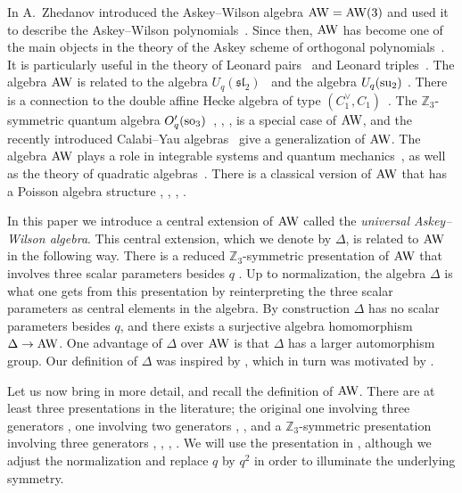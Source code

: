 \documentclass[pdftex]{sigma}
\numberwithin{equation}{section}
\begin{document}
In \cite{Zhidd}
A.~Zhedanov introduced the Askey--Wilson algebra
${\rm AW}=
{\rm AW}(3)$
and used it to
describe the Askey--Wilson polynomials~\cite{Askey}.
Since then, ${\rm AW}$ has become one of the main
objects in the theory
of the Askey scheme
of orthogonal polynomials~\cite{GYLZmut,
  GYZlinear,
  GH1,
KoeSwa, Koo1,Koo2, VZ2,VZ3}.
It is particularly useful
in the theory of
Leonard pairs~\cite{NT:span,
LS99,
madrid,
aw,
vidunas,
V2}
and Leonard triples~\cite{Curt2,Curt1,
koro}.
The algebra
${\rm AW}$
is related to
the algebra
$U_q(\mathfrak{sl}_2)$~\cite{GYZnature,
  GYZlinear,
Rosengren,
rosengren,
wieg}
and the algebra
{$U\sb q(\rm su\sb 2)$}
\cite{atak1, atak2,atak3}.
There is a connection to the
double af\/f\/ine Hecke algebra
of type $(C^\vee_1,C_1)$~\cite{dahater,
Koo1,Koo2}.
The $\mathbb Z_3$-symmetric quantum
algebra $O'_q({\rm so}_3)$~\cite[Remark~6.11]{ciccoli},
\cite{fairlie},
\cite[Section~3]{su2},
\cite{posta,
posta2,
jordan,
odesskii}
is a special case of
${\rm AW}$,  and
the recently introduced Calabi--Yau algebras~\cite{calabi} give a generalization
of
${\rm AW}$.
The algebra ${\rm AW}$
plays a role in
integrable systems
\cite{aneva,bas2,bas1,bas3,bas4,bas5,bas6,bas7,bas8,basnc,
lav1,lav2,lav3,VZ}
and quantum mechanics~\cite{odake2,
odake}, as well as
the theory of quadratic algebras~\cite{jordan,
kalnins,
ros}.
There is a classical version of
${\rm AW}$
that has
a Poisson algebra structure
\cite{GYLZmut}, \cite[equation~(2.9)]{koro}, \cite[equations (26)--(28)]{oblomkov}, \cite{LPcm}.

In this paper we introduce a
central extension of ${\rm AW}$
called the {\it universal Askey--Wilson algebra}.
This central extension, which we denote by
$\Delta$, is related to
${\rm AW}$ in the following way.
There is a
reduced $\mathbb Z_3$-symmetric presentation
of ${\rm AW}$ that involves three scalar
parameters besides $q$
\cite[equation~(6.1)]{koro}.
Up to normalization, the algebra
$\Delta $ is what one gets from
this presentation
by reinterpreting the three scalar parameters
as central elements in the algebra.
By construction
$\Delta$ has no scalar parameters besides $q$,
and there exists a surjective algebra homomorphism
$\Delta \to
{\rm AW}$.
One advantage of
$\Delta$ over ${\rm AW}$
is that $\Delta$ has a larger automorphism
group. Our def\/inition of $\Delta$ was inspired by
\cite[Section 3]{dahater}, which in turn was motivated by
\cite{ion}.


Let us now bring in more detail, and
recall the def\/inition of
${\rm AW}$. There are at least three presentations in the
literature; the original one involving three
generators
\cite[equations~(1.1a)--(1.1c)]{Zhidd},
one involving two generators
\cite[equations~(2.1), (2.2)]{Koo1},
\cite[Theorem~1.5]{aw},
and a $\mathbb Z_3$-symmetric presentation involving three generators
\cite[equation~(6.1)]{koro},
\cite[p.~101]{ros},
\cite{smithandbell},
\cite[Section~4.3]{wieg}.
We will use the presentation
in \cite[equation~(6.1)]{koro},
although we adjust the
normalization and replace
$q$ by $q^2$
in order to illuminate the underlying symmetry.
\end{document}
